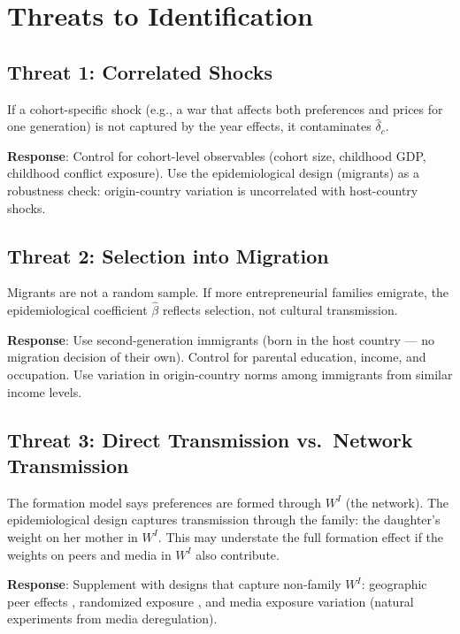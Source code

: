 \documentclass[../structural_economics_book.tex]{subfiles}
\begin{document}
\section{Threats to Identification}
\label{ch11:sec:threats}

\subsection{Threat 1: Correlated Shocks}

If a cohort-specific shock (e.g., a war that affects both preferences and prices for one generation) is not captured by the year effects, it contaminates $\hat{\delta}_c$.

\textbf{Response}: Control for cohort-level observables (cohort size, childhood GDP, childhood conflict exposure). Use the epidemiological design (migrants) as a robustness check: origin-country variation is uncorrelated with host-country shocks.


\subsection{Threat 2: Selection into Migration}

Migrants are not a random sample. If more entrepreneurial families emigrate, the epidemiological coefficient $\hat{\beta}$ reflects selection, not cultural transmission.

\textbf{Response}: Use second-generation immigrants (born in the host country --- no migration decision of their own). Control for parental education, income, and occupation. Use variation in origin-country norms among immigrants from similar income levels.


\subsection{Threat 3: Direct Transmission vs.\ Network Transmission}

The formation model says preferences are formed through $W^I$ (the network). The epidemiological design captures transmission through the family: the daughter's weight on her mother in $W^I$. This may understate the full formation effect if the weights on peers and media in $W^I$ also contribute.

\textbf{Response}: Supplement with designs that capture non-family $W^I$: geographic peer effects \citep{fogli2011nature}, randomized exposure \citep{bernard2014future}, and media exposure variation (natural experiments from media deregulation).
\end{document}
